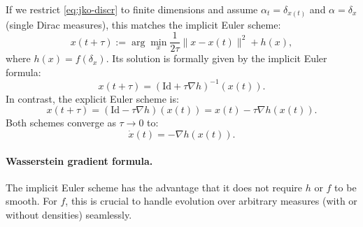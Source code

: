 If we restrict \eqref{eq:jko-discr} to finite dimensions and assume $\alpha_t = \delta_{x(t)}$ and $\alpha = \delta_x$ (single Dirac measures), this matches the implicit Euler scheme:
\begin{equation*}
    x(t+\tau) := \arg\min_x \frac{1}{2 \tau} \|x - x(t)\|^2 + h(x),
\end{equation*}
where $h(x) = f(\delta_x)$. Its solution is formally given by the implicit Euler formula:
\begin{equation*}
    x(t+\tau) = (\mathrm{Id} + \tau \nabla h)^{-1}(x(t)).
\end{equation*}
In contrast, the explicit Euler scheme is:
\begin{equation*}
    x(t+\tau) = (\mathrm{Id} - \tau \nabla h)(x(t)) = x(t) - \tau \nabla h(x(t)).
\end{equation*}
Both schemes converge as $\tau \to 0$ to:
\begin{equation}
    \dot{x}(t) = -\nabla h(x(t)). \label{eq:grad-flow-classical}
\end{equation}


\paragraph{Wasserstein gradient formula.}

The implicit Euler scheme has the advantage that it does not require $h$ or $f$ to be smooth. For $f$, this is crucial to handle evolution over arbitrary measures (with or without densities) seamlessly.

